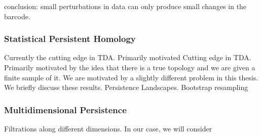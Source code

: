 conclusion: small perturbations in data can only produce small changes in the barcode.

\subsubsection{Statistical Persistent Homology}
\label{subsubsec:ph_statistics}
Currently the cutting edge in TDA.
Primarily motivated
Cutting edge in TDA.
Primarily motivated by the idea that there is a true topology and we are given a finite sample of it.
We are motivated by a slightly different problem in this thesis.
We briefly discuss these results.
Persistence Landscapes.
Bootstrap resampling

\subsubsection{Multidimensional Persistence}

Filtrations along different dimensions.
In our case, we will consider 

